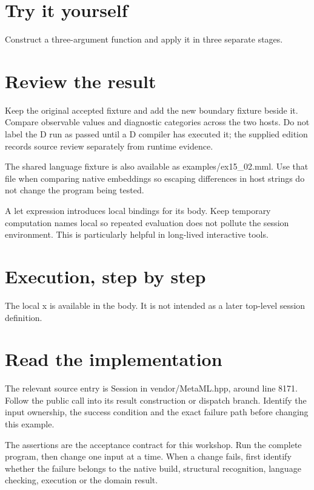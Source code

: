 \section*{Try it yourself}
Construct a three-argument function and apply it in three separate stages.

\section*{Review the result}
Keep the original accepted fixture and add the new boundary fixture beside it. Compare observable values and diagnostic categories across the two hosts. Do not label the D run as passed until a D compiler has executed it; the supplied edition records source review separately from runtime evidence.

The shared language fixture is also available as examples/ex15\_02.mml. Use that file when comparing native embeddings so escaping differences in host strings do not change the program being tested.

\clearpage
{}
A let expression introduces local bindings for its body. Keep temporary computation names local so repeated evaluation does not pollute the session environment. This is particularly helpful in long-lived interactive tools.


\section*{Execution, step by step}
The local x is available in the body. It is not intended as a later top-level session definition.

\section*{Read the implementation}
The relevant source entry is Session in vendor/MetaML.hpp, around line 8171. Follow the public call into its result construction or dispatch branch. Identify the input ownership, the success condition and the exact failure path before changing this example.

The assertions are the acceptance contract for this workshop. Run the complete program, then change one input at a time. When a change fails, first identify whether the failure belongs to the native build, structural recognition, language checking, execution or the domain result.

